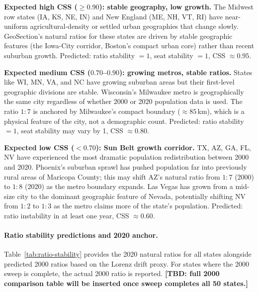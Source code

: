 \textbf{Expected high CSS ($\geq 0.90$): stable geography, low growth.}
The Midwest row states (IA, KS, NE, IN) and New England (ME, NH, VT, RI)
have near-uniform agricultural-density or settled urban geographies that
change slowly.
GeoSection's natural ratios for these states are driven by stable geographic
features (the Iowa-City corridor, Boston's compact urban core) rather than
recent suburban growth.
Predicted: ratio stability $= 1$, seat stability $= 1$,
CSS $\approx 0.95$.

\textbf{Expected medium CSS ($0.70$--$0.90$): growing metros, stable ratios.}
States like WI, MN, VA, and NC have growing suburban areas but their
first-level geographic divisions are stable.
Wisconsin's Milwaukee metro is geographically the same city regardless of
whether 2000 or 2020 population data is used.
The ratio $1:7$ is anchored by Milwaukee's compact boundary ($\approx 85$\,km),
which is a physical feature of the city, not a demographic count.
Predicted: ratio stability $= 1$, seat stability may vary by 1,
CSS $\approx 0.80$.

\textbf{Expected low CSS ($< 0.70$): Sun Belt growth corridor.}
TX, AZ, GA, FL, NV have experienced the most dramatic population
redistribution between 2000 and 2020.
Phoenix's suburban sprawl has pushed population far into previously rural
areas of Maricopa County; this may shift AZ's natural ratio from $1:7$ (2000)
to $1:8$ (2020) as the metro boundary expands.
Las Vegas has grown from a mid-size city to the dominant geographic feature
of Nevada, potentially shifting NV from $1:2$ to $1:3$ as the metro claims
more of the state's population.
Predicted: ratio instability in at least one year, CSS $\approx 0.60$.

\paragraph{Ratio stability predictions and 2020 anchor.}
Table~\ref{tab:ratio-stability} provides the 2020 natural ratios for all
states alongside predicted 2000 ratios based on the Lorenz drift proxy.
For states where the 2000 sweep is complete, the actual 2000 ratio is reported.
\textbf{[TBD: full 2000 comparison table will be inserted once sweep completes
all 50 states.]}

